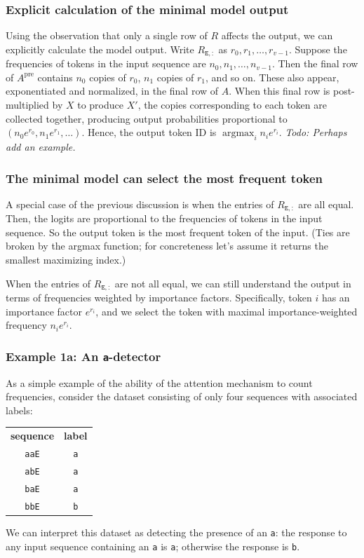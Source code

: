 \documentclass{article}
\newcommand{\tE}{\mathtt{E}}
\newcommand{\todo}[1]{\emph{Todo: #1}}
\DeclareMathOperator*{\argmax}{argmax}
\begin{document}
\subsubsection*{Explicit calculation of  the minimal model output}

Using the observation that only a single row of $R$ affects the
output, we can explicitly calculate the model output. Write
$R_{\tE,:}$ as $r_0, r_1, \ldots, r_{v-1}$. Suppose the frequencies of
tokens in the input sequence are $n_0, n_1, \ldots, n_{v-1}$. Then the
final row of $A^\text{pre}$ contains $n_0$ copies of $r_0$, $n_1$
copies of $r_1$, and so on. These also appear, exponentiated and
normalized, in the final row of $A$. When this final row is
post-multiplied by $X$ to produce $X'$, the copies corresponding to
each token are collected together, producing output probabilities
proportional to $(n_0 e^{r_0}, n_1 e^{r_1}, \ldots)$. Hence, the
output token ID is $\argmax_i n_i e^{r_i}$. \todo{Perhaps add an example.}


\subsubsection*{The minimal model can select the most frequent token}

A special case of the previous discussion is when the entries of
$R_{\tE,:}$ are all equal. Then, the logits are proportional to the
frequencies of tokens in the input sequence. So the output token is
the most frequent token of the input. (Ties are broken by the argmax
function; for concreteness let's assume it returns the smallest
maximizing index.)

When the entries of $R_{\tE,:}$ are not all equal, we can still
understand the output in terms of frequencies weighted by importance
factors. Specifically, token $i$ has an importance factor $e^{r_i}$,
and we select the token with maximal importance-weighted frequency
$n_i e^{r_i}$.

\subsubsection*{Example 1a: An \texttt{a}-detector}

As a simple example of the ability of the attention mechanism to count
frequencies, consider the dataset consisting of only four sequences with
associated labels:
\begin{center}
\begin{tabular}{cc}
  \textbf{sequence} & \textbf{label} \\
  \texttt{aaE} & \texttt{a} \\
  \texttt{abE} & \texttt{a} \\
  \texttt{baE} & \texttt{a} \\
  \texttt{bbE} & \texttt{b} \\
\end{tabular}
\end{center}
We can interpret this dataset as detecting the presence of an
\texttt{a}: the response to any input sequence containing an \texttt{a}
is \texttt{a}; otherwise the response is \texttt{b}.
\end{document}
